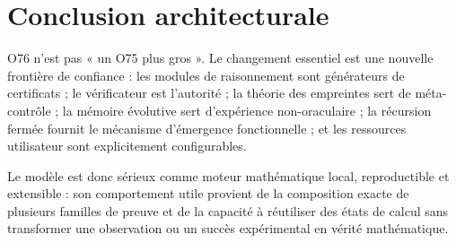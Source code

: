 \documentclass[11pt,a4paper]{article}
\begin{document}
\section{Conclusion architecturale}
O76 n'est pas « un O75 plus gros ». Le changement essentiel est une nouvelle frontière de confiance : les modules de raisonnement sont générateurs de certificats ; le vérificateur est l'autorité ; la théorie des empreintes sert de méta-contrôle ; la mémoire évolutive sert d'expérience non-oraculaire ; la récursion fermée fournit le mécanisme d'émergence fonctionnelle ; et les ressources utilisateur sont explicitement configurables.

Le modèle est donc sérieux comme moteur mathématique local, reproductible et extensible : son comportement utile provient de la composition exacte de plusieurs familles de preuve et de la capacité à réutiliser des états de calcul sans transformer une observation ou un succès expérimental en vérité mathématique.
\end{document}
